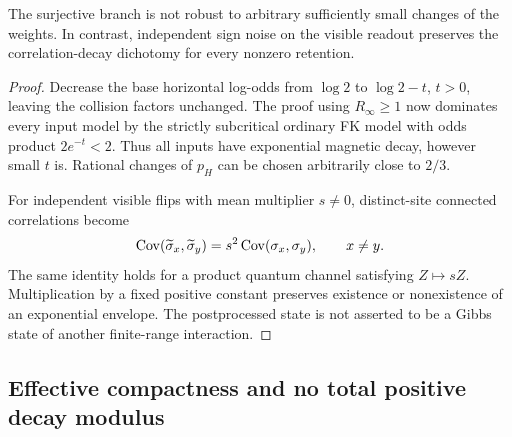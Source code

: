 \begin{proposition}\label{prop:fragile}
The surjective branch is not robust to arbitrary sufficiently small changes of the weights. In contrast, independent sign noise on the visible readout preserves the correlation-decay dichotomy for every nonzero retention.
\end{proposition}
\begin{proof}
Decrease the base horizontal log-odds from \(\log2\) to \(\log2-t\), \(t>0\), leaving the collision factors unchanged. The proof using \(R_\infty\ge1\) now dominates every input model by the strictly subcritical ordinary FK model with odds product \(2e^{-t}<2\). Thus all inputs have exponential magnetic decay, however small \(t\) is. Rational changes of \(p_H\) can be chosen arbitrarily close to \(2/3\).

For independent visible flips with mean multiplier \(s\ne0\), distinct-site connected correlations become
\begin{equation}
 \operatorname{Cov}(\widetilde\sigma_x,\widetilde\sigma_y)
   =s^2\operatorname{Cov}(\sigma_x,\sigma_y),\qquad x\ne y.
\end{equation}
The same identity holds for a product quantum channel satisfying \(Z\mapsto sZ\). Multiplication by a fixed positive constant preserves existence or nonexistence of an exponential envelope. The postprocessed state is not asserted to be a Gibbs state of another finite-range interaction.
\end{proof}

\subsection{Effective compactness and no total positive decay modulus}

